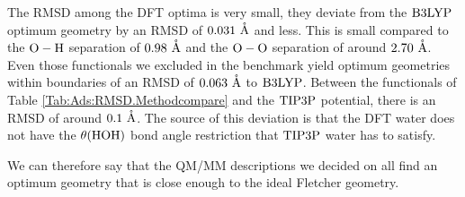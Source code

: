 \documentclass[8.5pt,twoside,twocolumn]{article}
\renewcommand{\Ang}{\mathring{\te{A}}}
\theoremstyle{standard}
\begin{document}
The RMSD among the DFT optima is very small, they deviate from the
$\text{B3LYP}$ optimum geometry by an RMSD of $0.031~\Ang$ and less. This is small
compared to the $\text O - \text H$ separation of $0.98~\Ang$ and the $\text O - \text
O$ separation of around $2.70~\Ang$. Even those functionals we excluded in the
benchmark yield optimum geometries within boundaries of an RMSD of $0.063~\Ang$ to $\text{B3LYP}$. Between the functionals of Table \ref{Tab:Ads:RMSD.Methodcompare} and the $\text{TIP3P}$ potential,
there is an RMSD of around $0.1~\Ang$. The source of this deviation is that the
DFT water does not have the $\theta(\text{HOH})$ bond angle restriction that $\text{TIP3P}$ water
has to satisfy.

We can therefore say that the QM/MM descriptions we decided on all find an
optimum geometry that is close enough to the ideal Fletcher geometry. 
\end{document}
